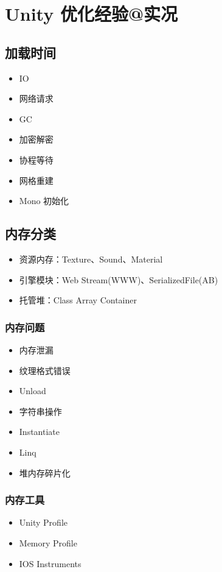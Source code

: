 \documentclass[UTF8,a4paper,12pt]{ctexbook}
\begin{document}
\chapter{Unity 优化经验@实况}
	\section{加载时间}
		\begin{itemize}
			\item IO
			\item 网络请求
			\item GC
			\item 加密解密
			\item 协程等待
			\item 网格重建
			\item Mono 初始化
		\end{itemize}
	
	\section{内存分类}
		\begin{itemize}
			\item 资源内存：Texture、Sound、Material
			\item 引擎模块：Web Stream(WWW)、SerializedFile(AB)
			\item 托管堆：Class Array Container
		\end{itemize}
		
		\subsection{内存问题}
			\begin{itemize}
				\item 内存泄漏
				\item 纹理格式错误
				\item Unload
				\item 字符串操作
				\item Instantiate
				\item Linq
				\item 堆内存碎片化
			\end{itemize}
		
		\subsection{内存工具}
			\begin{itemize}
				\item Unity Profile
				\item Memory Profile
				\item IOS Instruments
			\end{itemize}	
		
\end{document}
